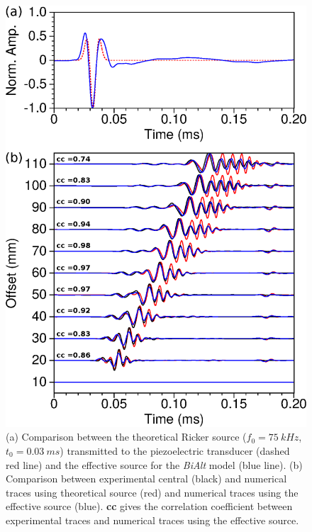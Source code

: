 \documentclass[extra,mreferee]{gji}
\newcommand{\bialt}{\textit{BiAlt} }
\begin{document}
\begin{figure}
\centering
\includegraphics[width=0.50\columnwidth]{Fig/Fig11.eps}
\caption{(a) Comparison between the theoretical Ricker source ($f_{0}=75\ kHz$, $t_{0}=0.03\ ms$) transmitted to the piezoelectric transducer (dashed red line) and the effective source for the \bialt model (blue line). (b) Comparison between experimental central (black) and numerical traces using theoretical source (red) and numerical traces using the effective source (blue). \textbf{cc} gives the correlation coefficient between experimental traces and numerical traces using the effective source.}
\label{Fig:Fig11}
\end{figure}
\end{document}
